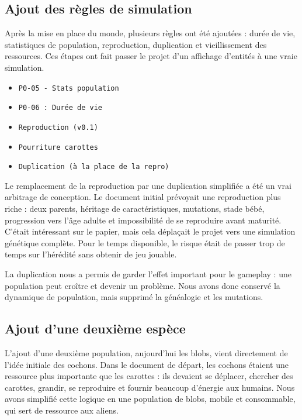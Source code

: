 ﻿\documentclass[11pt,a4paper]{article}
\begin{document}
\subsection{Ajout des règles de simulation}

Après la mise en place du monde, plusieurs règles ont été ajoutées : durée de vie, statistiques de population, reproduction, duplication et vieillissement des ressources. Ces étapes ont fait passer le projet d'un affichage d'entités à une vraie simulation.

\begin{itemize}[noitemsep]
  \item \texttt{P0-05 - Stats population}
  \item \texttt{P0-06 : Durée de vie}
  \item \texttt{Reproduction (v0.1)}
  \item \texttt{Pourriture carottes}
  \item \texttt{Duplication (à la place de la repro)}
\end{itemize}

Le remplacement de la reproduction par une duplication simplifiée a été un vrai arbitrage de conception. Le document initial prévoyait une reproduction plus riche : deux parents, héritage de caractéristiques, mutations, stade bébé, progression vers l'âge adulte et impossibilité de se reproduire avant maturité. C'était intéressant sur le papier, mais cela déplaçait le projet vers une simulation génétique complète. Pour le temps disponible, le risque était de passer trop de temps sur l'hérédité sans obtenir de jeu jouable.

La duplication nous a permis de garder l'effet important pour le gameplay : une population peut croître et devenir un problème. Nous avons donc conservé la dynamique de population, mais supprimé la généalogie et les mutations.

\subsection{Ajout d'une deuxième espèce}

L'ajout d'une deuxième population, aujourd'hui les blobs, vient directement de l'idée initiale des cochons. Dans le document de départ, les cochons étaient une ressource plus importante que les carottes : ils devaient se déplacer, chercher des carottes, grandir, se reproduire et fournir beaucoup d'énergie aux humains. Nous avons simplifié cette logique en une population de blobs, mobile et consommable, qui sert de ressource aux aliens.
\end{document}
